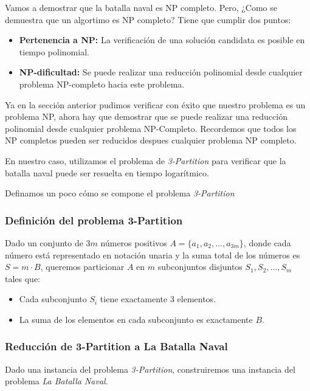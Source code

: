 Vamos a demostrar que la batalla naval es NP completo. Pero, ¿Como se demuestra que un algortimo es NP completo? Tiene que cumplir dos puntos: 

\begin{itemize}
    \item \textbf{Pertenencia a NP:} La verificación de una solución candidata es posible en tiempo polinomial.
    \item \textbf{NP-dificultad:} Se puede realizar una reducción polinomial desde cualquier problema NP-completo hacia este problema.
\end{itemize}

Ya en la sección anterior pudimos verificar con éxito que nuestro problema es un problema NP, ahora hay que demostrar que se puede realizar una reducción polinomial desde cualquier problema NP-Completo. Recordemos que todos los NP completos pueden ser reducidos despues cualquier problema NP completo. 

En nuestro caso, utilizamos el problema de \textit{3-Partition} para verificar que la batalla naval puede ser resuelta en tiempo logarítmico.


Definamos un poco cómo se compone el problema \textit{3-Partition}



\subsubsection*{Definición del problema 3-Partition}

Dado un conjunto de \(3m\) números positivos \(A = \{a_1, a_2, \dots, a_{3m}\}\), donde cada número está representado en notación unaria y la suma total de los números es \(S = m \cdot B\), queremos particionar \(A\) en \(m\) subconjuntos disjuntos \(S_1, S_2, \dots, S_m\) tales que:
\begin{itemize}
    \item Cada subconjunto \(S_i\) tiene exactamente 3 elementos.
    \item La suma de los elementos en cada subconjunto es exactamente \(B\).
\end{itemize}

\subsubsection*{Reducción de 3-Partition a La Batalla Naval}

Dado una instancia del problema \textit{3-Partition}, construiremos una instancia del problema \textit{La Batalla Naval}.

